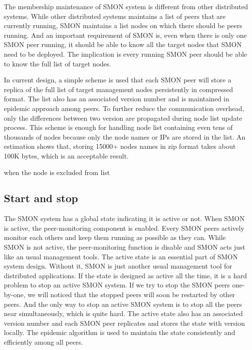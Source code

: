 The membership maintenance of SMON system is different from
other distributed systems. While other distributed systems
maintains a list of peers that are currently running, SMON
maintains a list nodes on which there should be peers
running.  And an important requirement of SMON is, even when
there is only one SMON peer running, it should be able to
know all the target nodes that SMON need to be deployed. The
implication is every running SMON peer should be able to
know the full list of target nodes.

In current design, a simple scheme is used that each SMON
peer will store a replica of the full list of target
management nodes persistently in compressed format. The list
also has an associated version number and is maintained in
epidemic approach among peers. To further reduce the
communication overhead, only the differences between two
version are propagated during node list update process. This
scheme is enough for handling node list containing even tens
of thousands of nodes because only the node names or IPs are
stored in the list.  An estimation shows that, storing
15000+ nodes names in zip format takes about 100K bytes,
which is an acceptable result.

when the node is excluded from list

\subsection{Start and stop}

The SMON system has a global state indicating it is active
or not. When SMON is active, the peer-monitoring component
is enabled. Every SMON peers actively monitor each others
and keep them running as possible as they can. While SMON is
not active, the peer-monitoring function is disable and SMON
acts just like an usual management tools. The active state
is an essential part of SMON system design. Without it, SMON
is just another usual management tool for distributed
applications. If the state is designed as active all the
time, it is a hard problem to stop an active SMON system. If
we try to stop the SMON peers one-by-one, we will noticed
that the stopped peers will soon be restarted by other
peers. And the only way to stop an active SMON system is to
stop all the peers near simultaneously, which is quite hard.
The active state also has an associated version number and
each SMON peer replicates and stores the state with version
locally.  The epidemic algorithm is used to maintain the
state consistently and efficiently among all peers.


